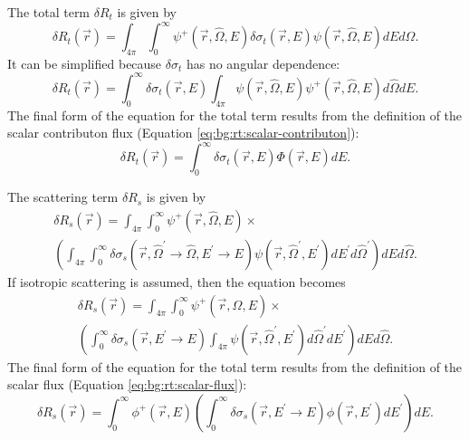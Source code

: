 The total term $\delta R_t$ is given by
\begin{equation}\label{eq:dr:dr_t_term_1}
  \delta R_t\left(\vec{r}\right) =
  \int_{4\pi}\int_0^\infty\psi^+\left(\vec{r},\hat{\Omega},E\right)\delta\sigma_t\left(\vec{r},E\right)\psi\left(\vec{r},\hat{\Omega},E\right)dEd\hat{\Omega}.
\end{equation}
It can be simplified because $\delta\sigma_t$ has no angular dependence:
\begin{equation}\label{eq:dr:dr_t_term_2}
  \delta R_t\left(\vec{r}\right) =
  \int_0^\infty\delta\sigma_t\left(\vec{r},E\right)\int_{4\pi}\psi\left(\vec{r},\hat{\Omega},E\right)\psi^+\left(\vec{r},\hat{\Omega},E\right)d\hat{\Omega}dE.
\end{equation}
The final form of the equation for the total term results from the definition of the scalar contributon flux (Equation \ref{eq:bg:rt:scalar-contributon}):
\begin{equation}\label{eq:dr:dr_t_term}
  \delta R_t\left(\vec{r}\right) =
  \int_0^\infty\delta\sigma_t\left(\vec{r},E\right)\Phi\left(\vec{r},E\right)dE.
\end{equation}

The scattering term $\delta R_s$ is given by
\begin{multline}\label{eq:dr:dr_s_term_1}
  \delta R_s\left(\vec{r}\right) =
  \int_{4\pi}\int_0^\infty\psi^+\left(\vec{r},\hat{\Omega},E\right) \times \\
  \left(\int_{4\pi}\int_0^\infty\delta\sigma_s\left(\vec{r},\hat{\Omega}^\prime\rightarrow\hat{\Omega},E^\prime\rightarrow E\right)\psi\left(\vec{r},\hat{\Omega}^\prime,E^\prime\right)dE^\prime d\hat{\Omega}^\prime\right)dEd\hat{\Omega}.
\end{multline}
If isotropic scattering is assumed, then the equation becomes
\begin{multline}\label{eq:dr:dr_s_term_2}
  \delta R_s\left(\vec{r}\right) =
  \int_{4\pi}\int_0^\infty\psi^+\left(\vec{r},\hat{\Omega},E\right) \times \\
  \left(\int_0^\infty\delta\sigma_s\left(\vec{r},E^\prime\rightarrow E\right)\int_{4\pi}\psi\left(\vec{r},\hat{\Omega}^\prime,E^\prime\right)d\hat{\Omega}^\prime dE^\prime\right)dEd\hat{\Omega}.
\end{multline}
The final form of the equation for the total term results from the definition of the scalar flux (Equation \ref{eq:bg:rt:scalar-flux}):
\begin{equation}\label{eq:dr:dr_s_term}
  \delta R_s\left(\vec{r}\right) =
  \int_0^\infty\phi^+\left(\vec{r},E\right)\left(\int_0^\infty\delta\sigma_s\left(\vec{r},E^\prime\rightarrow E\right)\phi\left(\vec{r},E^\prime\right)dE^\prime\right)dE.
\end{equation}

